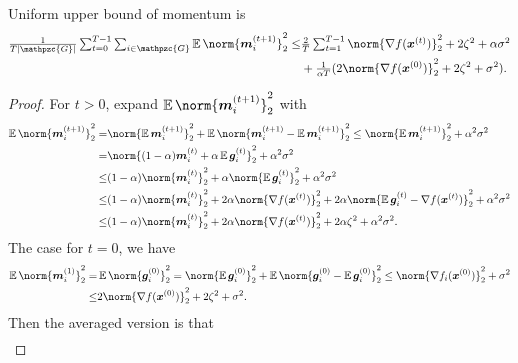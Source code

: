 \documentclass{article}
\newcommand{\gset}{\ensuremath{{\mathpzc{G}}}}
\begin{document}
\begin{lemma}%
  \label{lemma:mi}
  Uniform upper bound of momentum is
  \begin{align*}
    \tfrac{1}{T|\gset|}\tsum_{t=0}^{T-1} \tsum_{i\in\gset}
    \E\norm{\mm_i^{(t+1)}}_2^2
    \le &
    \tfrac{2}{T}\tsum_{t=1}^{T-1} \norm{\nabla f(\xx^{(t)}) }_2^2
    +  2  \zeta^2
    + \alpha\sigma^2                                             \\
        & + \tfrac{1}{\alpha T}(2\norm{\nabla f(\xx^{(0)}) }_2^2
    + 2 \zeta^2
    + \sigma^2).
  \end{align*}
\end{lemma}
\begin{proof}
  For $t>0$, expand  $\E\norm{\mm_i^{(t+1)}}_2^2$ with
  \begin{align*}
    \E\norm{\mm_i^{(t+1)}}_2^2
    =   & \norm{\E\mm_i^{(t+1)}}_2^2 +  \E\norm{\mm_i^{(t+1)} - \E \mm_i^{(t+1)} }_2^2
    \leq \norm{\E\mm_i^{(t+1)}}_2^2 + \alpha^2\sigma^2                                 \\
    =   & \norm{(1-\alpha)\mm_i^{(t)} + \alpha \E\gg_i^{(t)}  }_2^2 + \alpha^2\sigma^2 \\
    \le & (1-\alpha) \norm{\mm_i^{(t)} }_2^2
    +  \alpha  \norm{\E\gg_i^{(t)}  }_2^2
    + \alpha^2\sigma^2                                                                 \\
    \le & (1-\alpha) \norm{\mm_i^{(t)} }_2^2
    +  2\alpha  \norm{\nabla f(\xx^{(t)}) }_2^2
    +  2\alpha  \norm{\E\gg_i^{(t)} - \nabla f(\xx^{(t)}) }_2^2
    + \alpha^2\sigma^2                                                                 \\
    \le & (1-\alpha) \norm{\mm_i^{(t)} }_2^2
    +  2\alpha  \norm{\nabla f(\xx^{(t)}) }_2^2
    +  2\alpha  \zeta^2
    + \alpha^2\sigma^2.
  \end{align*}
  The case for $t=0$, we have
  \begin{align*}
    \E\norm{\mm_i^{(1)}}_2^2= & \E\norm{\gg_i^{(0)}}_2^2 = \norm{\E\gg_i^{(0)}}_2^2+\E\norm{\gg_i^{(0)} - \E\gg_i^{(0)}}_2^2 \leq \norm{\nabla f_i(\xx^{(0)}) }_2^2
    + \sigma^2                                                                                                                                                      \\
    \le                       & 2\norm{\nabla f(\xx^{(0)}) }_2^2
    + 2 \zeta^2
    + \sigma^2.
  \end{align*}
  Then the averaged version is that
  \begin{align*}

\end{align*}
\end{proof}
\end{document}
